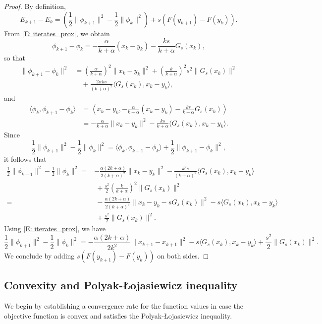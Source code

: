\documentclass[onefignum,onetabnum]{siamart220329}
\begin{document}
\begin{proof}
By definition,
$$E_{k+1} - E_k = \left( \frac{1}{2}\| \phi_{k+1} \|^2 - \frac{1}{2}\| \phi_k \|^2 \right) + s\left( F(y_{k+1}) - F(y_k) \right).  $$
From \eqref{E: iterates_prox}, we obtain
$$ \phi_{k+1} - \phi_k = - \frac{\alpha}{k+\alpha}(x_k-y_k) - \frac{k s}{k+\alpha} G_s(x_k), $$
so that
\begin{align*}
\| \phi_{k+1} - \phi_k \|^2 
&= \left( \frac{\alpha}{k+\alpha} \right)^2 \| x_k - y_k \|^2 
  + \left( \frac{k}{k+\alpha} \right)^2 s^2 \| G_s(x_k) \|^2 \\
&\quad + \frac{2\alpha k s}{(k+\alpha)^2} \langle G_s(x_k), x_k-y_k \rangle, 
\end{align*}
and
\begin{align*}
\langle \phi_k, \phi_{k+1} - \phi_k \rangle
&= \left\langle x_k - y_k, - \frac{\alpha}{k+\alpha}(x_k-y_k) - \frac{k s}{k+\alpha} G_s(x_k) \right\rangle \\
&= - \frac{\alpha}{k+\alpha} \| x_k - y_k \|^2 - \frac{k s}{k+\alpha} \langle G_s(x_k), x_k - y_k \rangle.  
\end{align*}
Since 
$$\frac{1}{2}\| \phi_{k+1} \|^2 - \frac{1}{2}\| \phi_k \|^2 = \langle \phi_k, \phi_{k+1} - \phi_k \rangle + \frac{1}{2}\| \phi_{k+1} - \phi_k \|^2,$$ 
it follows that
\begin{align*}
\frac{1}{2}\| \phi_{k+1} \|^2 - \frac{1}{2}\| \phi_k \|^2  
= & - \frac{\alpha (2k+\alpha)}{2(k+\alpha)^2} \| x_k - y_k \|^2 
- \frac{k^2 s}{(k+\alpha)^2} \langle G_s(x_k), x_k - y_k \rangle  \\
& \  + \frac{s^2}{2}\left( \frac{k}{k+\alpha} \right)^2  \| G_s(x_k) \|^2   \\
= & \ - \frac{\alpha (2k+\alpha)}{2(k+\alpha)^2} \| x_k - y_k - s G_s(x_k) \|^2
   - s\langle G_s(x_k), x_k - y_k \rangle   \\
& \  + \frac{s^2}{2} \| G_s(x_k) \|^2.
\end{align*}
Using \eqref{E: iterates_prox}, we have
$$\frac{1}{2}\| \phi_{k+1} \|^2 - \frac{1}{2}\| \phi_k \|^2 = - \frac{\alpha (2k+\alpha)}{2k^2} \| x_{k+1} - x_{k+1} \|^2  - s\langle G_s(x_k), x_k - y_k \rangle 
   + \frac{s^2}{2} \| G_s(x_k) \|^2.$$
We conclude by adding $s\left( F(y_{k+1}) - F(y_k) \right)$ on both sides.
\end{proof}




\subsection{Convexity and Polyak-\L ojasiewicz inequality}
We begin by establishing a convergence rate for the function values in case the objective function is convex and satisfies the Polyak-\L ojasiewicz inequality. 
\end{document}
